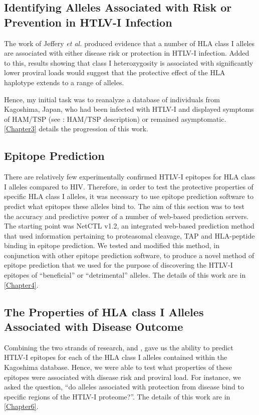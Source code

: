 \subsection{Identifying Alleles Associated with Risk or Prevention in HTLV-I Infection}\label{chapter1/AlleleAssoc}

The work of Jeffery \emph{et al.} \citep{Jeffery1999} produced evidence that a number of HLA class I alleles are associated with either disease risk or protection in HTLV-I infection. Added to this, results showing that class I heterozygosity is associated with significantly lower proviral loads \citep{Jeffery2000} would suggest that the protective effect of the HLA haplotype extends to a range of alleles.

Hence, my initial task was to reanalyze a database of individuals from Kagoshima, Japan, who had been infected with HTLV-I and displayed symptoms of HAM/TSP (see : HAM/TSP description) or remained asymptomatic. \cref{Chapter3} details the progression of this work.

\subsection{Epitope Prediction}\label{chapter1/EpPred}

There are relatively few experimentally confirmed HTLV-I epitopes for HLA class I alleles compared to HIV. Therefore, in order to test the protective properties of specific HLA class I alleles, it was necessary to use epitope prediction software to predict what epitopes these alleles bind to. The aim of this section was to test the accuracy and predictive power of a number of web-based prediction servers. The starting point was NetCTL v1.2, an integrated web-based prediction method that used information pertaining to proteasomal cleavage, TAP and HLA-peptide binding in epitope prediction. We tested and modified this method, in conjunction with other epitope prediction software, to produce a novel method of epitope prediction that we used for the purpose of discovering the HTLV-I epitopes of ``beneficial'' or ``detrimental'' alleles. The details of this work are in \cref{Chapter4}.

\subsection{The Properties of HLA class I Alleles Associated with Disease Outcome}

Combining the two strands of research,  and , gave us the ability to predict HTLV-I epitopes for each of the HLA class I alleles contained within the Kagoshima database. Hence, we were able to test what properties of these epitopes were associated with disease risk and proviral load. For instance, we asked the question, ``do alleles associated with protection from disease bind to specific regions of the HTLV-I proteome?''. The details of this work are in \cref{Chapter6}.

